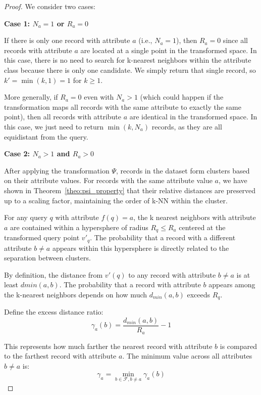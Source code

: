 \documentclass[numbers,sort]{article}
\begin{document}
\begin{proof}
We consider two cases:

\textbf{Case 1: $N_a = 1$ or $R_a = 0$}

If there is only one record with attribute $a$ (i.e., $N_a = 1$), then $R_a = 0$ since all records with attribute $a$ are located at a single point in the transformed space. In this case, there is no need to search for k-nearest neighbors within the attribute class because there is only one candidate. We simply return that single record, so $k' = \min(k, 1) = 1$ for $k \geq 1$.

More generally, if $R_a = 0$ even with $N_a > 1$ (which could happen if the transformation maps all records with the same attribute to exactly the same point), then all records with attribute $a$ are identical in the transformed space. In this case, we just need to return $\min(k, N_a)$ records, as they are all equidistant from the query.

\textbf{Case 2: $N_a > 1$ and $R_a > 0$}

After applying the transformation $\Psi$, records in the dataset form clusters based on their attribute values. For records with the same attribute value $a$, we have shown in Theorem~\ref{theo:psi_property} that their relative distances are preserved up to a scaling factor, maintaining the order of k-NN within the cluster.

For any query $q$ with attribute $f(q) = a$, the k nearest neighbors with attribute $a$ are contained within a hypersphere of radius $R_q \leq R_a$ centered at the transformed query point $v'_q$. The probability that a record with a different attribute $b \neq a$ appears within this hypersphere is directly related to the separation between clusters.

By definition, the distance from $v'(q)$ to any record with attribute $b \neq a$ is at least $d{min}(a, b)$. The probability that a record with attribute $b$ appears among the k-nearest neighbors depends on how much $d_{min}(a, b)$ exceeds $R_q$.

Define the excess distance ratio:
\begin{equation}
\gamma_a(b) = \frac{d_{min}(a, b)}{R_a} - 1
\end{equation}

This represents how much farther the nearest record with attribute $b$ is compared to the farthest record with attribute $a$. The minimum value across all attributes $b \neq a$ is:
\begin{equation}
\gamma_a = \min_{b \in \mathcal{F}, b \neq a} \gamma_a(b)
\end{equation}


\end{proof}
\end{document}
